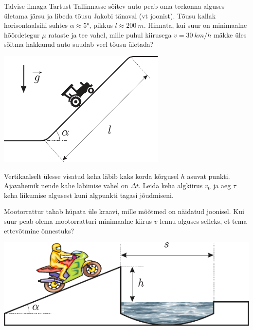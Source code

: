\documentclass[10pt]{article}
\begin{document}
{
Talvise ilmaga Tartust Tallinnasse sõitev auto peab oma teekonna alguses ületama järsu ja libeda tõusu Jakobi tänaval (vt joonist). Tõusu kallak horisontaalsihi suhtes $\alpha \approx \ang{5}$, pikkus $l \approx \SI{200}{m}$. Hinnata, kui suur on minimaalne hõõrdetegur $\mu$ rataste ja tee vahel, mille puhul kiirusega $v = \SI{30}{km/h}$ mäkke üles sõitma hakkanud auto suudab veel tõusu ületada?

\begin{center}
	\includegraphics[width=0.5\linewidth]{2005-lahg-02-yl}
\end{center}
\probend
\bigskip


Vertikaalselt ülesse visatud keha läbib kaks korda kõrgusel $h$ asuvat punkti. Ajavahemik nende kahe läbimise vahel on $\Delta t$. Leida keha algkiirus $v_0$ ja aeg $\tau$ keha liikumise algusest kuni algpunkti tagasi jõudmiseni.
\probend
\bigskip


Mootorrattur tahab hüpata üle kraavi, mille mõõtmed on näidatud joonisel. Kui suur peab olema mootorratturi minimaalne kiirus $v$ lennu alguses selleks, et tema ettevõtmine õnnestuks?

\begin{center}
	\includegraphics[width=0.8\linewidth]{2007-lahg-05-yl}
\end{center}
\probend
\newpage

}
\end{document}
